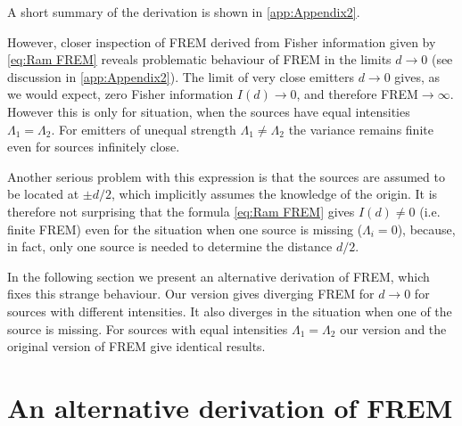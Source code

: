 A short summary of the derivation is shown in \autoref{app:Appendix2}. 

However, closer inspection of FREM derived from Fisher information given by \autoref{eq:Ram FREM} reveals problematic behaviour of FREM in the limits $d\rightarrow 0$ (see discussion in \autoref{app:Appendix2}). The limit of very close emitters $d\rightarrow0$ gives, as we would expect, zero Fisher information $I(d)\rightarrow0$, and therefore FREM$\rightarrow\infty$. However this is only for situation, when the sources have equal intensities $\Lambda_1=\Lambda_2$. For emitters of unequal strength $\Lambda_1\neq\Lambda_2$ the variance remains finite even for sources infinitely close. 

Another serious problem with this expression is that the sources are assumed to be located at $\pm d/2$, which implicitly assumes the knowledge of the origin. It is therefore not surprising that the formula \autoref{eq:Ram FREM} gives $I(d)\neq0$ (i.e. finite FREM) even for the situation when one source is missing ($\Lambda_i=0$), because, in fact, only one source is needed to determine the distance $d/2$. 

In the following section we present an alternative derivation of FREM, which fixes this strange behaviour. Our version gives diverging FREM for $d\rightarrow0$ for sources with different intensities. It also diverges in the situation when one of the source is missing. For sources with equal intensities $\Lambda_1=\Lambda_2$ our version and the original version of FREM give identical results. 


\section{An alternative derivation of FREM\label{sub:An-alternative-derivation-FREM}} 
 
